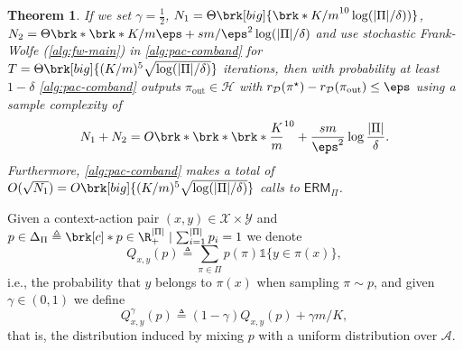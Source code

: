 \documentclass[11pt]{article}
\newcommand{\eqdef}{\triangleq}
\renewcommand{\ind}[1]{\mathds{1}\{#1\}}
\newcommand{\liad}[1]{\textcolor{blue}{\bf \{LE: #1\}}}
\newcommand{\yprob}[3]{Q_{#2,#3}(#1)}
\newcommand{\yprobg}[3]{Q^\gamma_{#2,#3}(#1)}
\newcommand{\oracle}{\textsf{ERM}}
\newcommand{\piout}{\pi_{\mathrm{out}}}
\newcommand{\calX}{\mathcal{X}}
\newcommand{\calY}{\mathcal{Y}}
\newcommand{\calH}{\mathcal{H}}
\newcommand{\calD}{\mathcal{D}}
\newcommand{\calA}{\mathcal{A}}
\theoremstyle{plain}
\newtheorem{theorem}{Theorem}
\begin{document}
\begin{theorem}
    \label{thm:pac-main}
    If we set $\gamma = \frac12$, $N_1 = \Theta \brk[big]{\brk*{K/m}^{10} \log (|\Pi|/\delta))}$, $N_2 = \Theta \brk*{\brk*{K/m \eps + s m / \eps^2}\log(|\Pi| / \delta) }$ and use stochastic Frank-Wolfe (\cref{alg:fw-main}) in \cref{alg:pac-comband} 
    for $T = \Theta \brk[big]{(K/m)^5 \sqrt{\log (|\Pi|/\delta)}}$ iterations, then with probability at least $1-\delta$ \cref{alg:pac-comband} outputs $\piout \in \calH$ with $r_\calD(\pi^\star) - r_\calD(\piout) \leq \eps$ using a sample complexity of 
    \begin{align*}
        N_1 + N_2 = O \brk*{\brk*{\brk*{\frac{K}{m}}^{10} + \frac{s m}{\eps^2}} \log \frac{|\Pi|}{\delta}}.
    \end{align*}
    Furthermore, \cref{alg:pac-comband} makes a total of $O(\sqrt{N_1}) = O \brk[big]{(K/m)^5 \sqrt{\log (|\Pi|/\delta)}}$ calls to $\oracle_\Pi$.
\end{theorem}
Given a context-action pair $(x,y) \in \calX \times \calY$ and $p \in \Delta_\Pi \eqdef \brk[c]*{p \in \R^{|\Pi|}_+ \mid \sum_{i=1}^{|\Pi|}p_i = 1}$ we denote 
\[
\yprob{p}{x}{y} \eqdef \sum_{\pi \in \Pi} p(\pi) \ind{y \in \pi(x)},
\]
i.e., the probability that $y$ belongs to $\pi(x)$ when sampling $\pi \sim p$, and given $\gamma \in (0,1)$ we define 
\[
\yprobg{p}{x}{y} \eqdef (1-\gamma) \yprob{p}{x}{y} + \gamma m / K,
\]
that is, the distribution induced by mixing $p$ with a uniform distribution over $\calA$.
\end{document}
